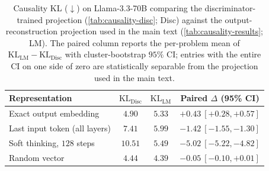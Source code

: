 
\begin{table}[!htbp]
  \caption{Causality KL ($\downarrow$) on Llama-3.3-70B comparing the discriminator-trained projection (\cref{tab:causality-disc}; Disc) against the output-reconstruction projection used in the main text (\cref{tab:causality-results}; LM). The paired column reports the per-problem mean of $\mathrm{KL}_{\mathrm{LM}} - \mathrm{KL}_{\mathrm{Disc}}$ with cluster-bootstrap $95\%$ CI; entries with the entire CI on one side of zero are statistically separable from the projection used in the main text.}
  \label{tab:causality-minproj-70b}
  \centering
  \footnotesize
  \setlength{\tabcolsep}{6pt}
  \renewcommand{\arraystretch}{1.15}
  \begin{tabular}{@{}l c c c@{}}
    \toprule
    Representation & $\mathrm{KL}_{\mathrm{Disc}}$ & $\mathrm{KL}_{\mathrm{LM}}$ & Paired $\Delta$ (95\% CI) \\
    \midrule
    Exact output embedding         & $4.90$ & $5.33$ & $+0.43\ [+0.28, +0.57]$ \\
    Last input token (all layers)  & $7.41$ & $5.99$ & $-1.42\ [-1.55, -1.30]$ \\
    Soft thinking, $128$ steps     & $10.51$ & $5.49$ & $-5.02\ [-5.22, -4.82]$ \\
    Random vector                  & $4.44$ & $4.39$ & $-0.05\ [-0.10, +0.01]$ \\
    \bottomrule
  \end{tabular}
\end{table}
